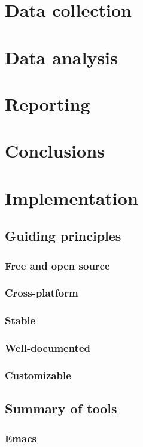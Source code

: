 \documentclass{book}
\begin{document}
\chapter{Data collection}
\label{sec-7}
\label{collection}
\chapter{Data analysis}
\label{sec-8}
\label{analysis}
\chapter{Reporting}
\label{sec-9}
\label{reporting}
\chapter{Conclusions}
\label{sec-10}
\label{conclusions}
\chapter{Implementation}
\label{sec-11}
\section{Guiding principles}
\label{sec-11-1}
\subsection{Free and open source}
\label{sec-11-1-1}
\subsection{Cross-platform}
\label{sec-11-1-2}
\subsection{Stable}
\label{sec-11-1-3}
\subsection{Well-documented}
\label{sec-11-1-4}
\subsection{Customizable}
\label{sec-11-1-5}
\section{Summary of tools}
\label{sec-11-2}
\subsection{Emacs}
\label{sec-11-2-1}
\end{document}
